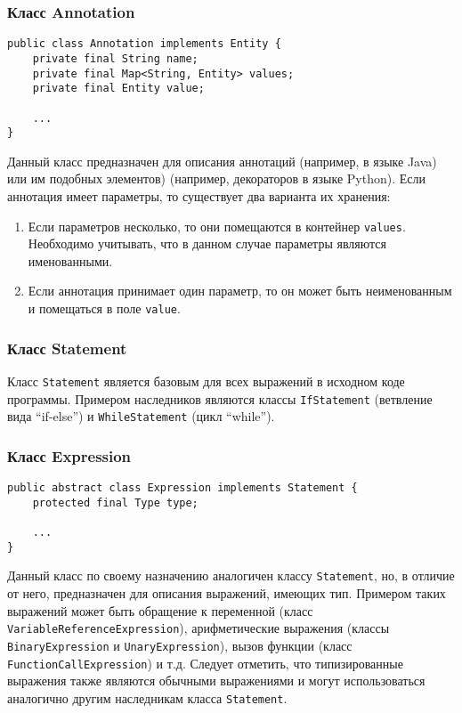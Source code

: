 \vspace{10pt}
\subsubsection{Класс Annotation}

\begin{lstlisting}[caption={Класс Annotation}]
public class Annotation implements Entity {
    private final String name;
    private final Map<String, Entity> values;
    private final Entity value;

    ...
}
\end{lstlisting}

Данный класс предназначен для описания аннотаций (например, в языке Java) или им
подобных элементов) (например, декораторов в языке Python). Если аннотация имеет
параметры, то существует два варианта их хранения:

\begin{enumerate}
    \item Если параметров несколько, то они помещаются в контейнер
    \texttt{values}. Необходимо учитывать, что в данном случае параметры
    являются именованными.
    \item Если аннотация принимает один параметр, то он может быть неименованным
    и помещаться в поле \texttt{value}.
\end{enumerate}

\subsubsection{Класс Statement}

Класс \texttt{Statement} является базовым для всех выражений в исходном коде
программы. Примером наследников являются классы \texttt{IfStatement} (ветвление
вида ``if-else'') и \texttt{WhileStatement} (цикл ``while'').

\newpage
\subsubsection{Класс Expression}

\begin{lstlisting}[caption={Класс Expression}]
public abstract class Expression implements Statement {
    protected final Type type;

    ...
}
\end{lstlisting}

Данный класс по своему назначению аналогичен классу \texttt{Statement}, но, в
отличие от него, предназначен для описания выражений, имеющих тип. Примером
таких выражений может быть обращение к переменной (класс
\texttt{VariableReferenceExpression}), арифметические выражения (классы
\texttt{BinaryExpression} и \texttt{UnaryExpression}), вызов функции (класс
\texttt{FunctionCallExpression}) и т.д. Следует отметить, что типизированные
выражения также являются обычными выражениями и могут использоваться аналогично
другим наследникам класса \texttt{Statement}.

